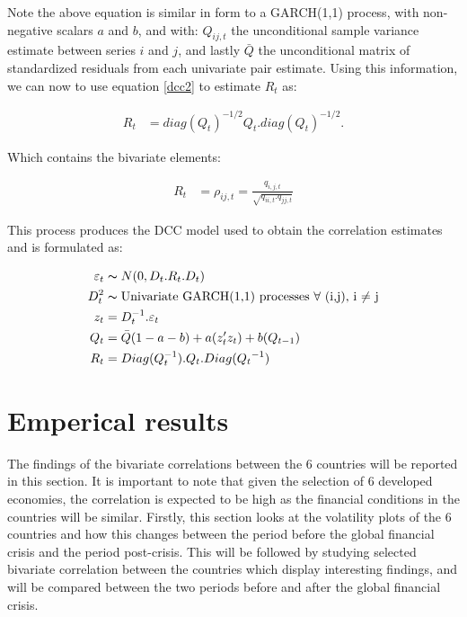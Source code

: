 \documentclass[11pt,preprint, authoryear]{elsarticle}
\numberwithin{equation}{section}
\numberwithin{figure}{section}
\numberwithin{table}{section}
\begin{document}
Note the above equation is similar in form to a GARCH(1,1) process, with
non-negative scalars \(a\) and \(b\), and with: \(Q_{ij, t}\) the
unconditional sample variance estimate between series \(i\) and \(j\),
and lastly \(\bar{Q}\) the unconditional matrix of standardized
residuals from each univariate pair estimate. Using this information, we
can now to use equation \ref{dcc2} to estimate \(R_t\) as:

\begin{align}\label{eq:dcc3}
R_t &= diag(Q_t)^{-1/2}Q_t.diag(Q_t)^{-1/2}. 
\end{align}

Which contains the bivariate elements:

\begin{align}
R_t &= \rho_{ij,t} = \frac{q_{i,j,t}}{\sqrt{q_{ii,t}.q_{jj,t}}} 
\end{align}

This process produces the DCC model used to obtain the correlation
estimates and is formulated as:

\begin{align}
\varepsilon_t &\thicksim  N(0,D_t.R_t.D_t) \notag \\
D_t^2 &\thicksim \text{Univariate GARCH(1,1) processes $\forall$ (i,j), i $\ne$ j} \notag \\
z_t&=D_t^{-1}.\varepsilon_t \notag \\
Q_t &= \bar{Q}(1-a-b)+a(z_t'z_t)+b(Q_{t-1}) \notag \\
                        R_t &= Diag(Q_t^{-1}).Q_t.Diag({Q_t}^{-1}) \notag \\
                        \end{align}

\section{Emperical results}\label{emperical-results}

The findings of the bivariate correlations between the 6 countries will
be reported in this section. It is important to note that given the
selection of 6 developed economies, the correlation is expected to be
high as the financial conditions in the countries will be similar.
Firstly, this section looks at the volatility plots of the 6 countries
and how this changes between the period before the global financial
crisis and the period post-crisis. This will be followed by studying
selected bivariate correlation between the countries which display
interesting findings, and will be compared between the two periods
before and after the global financial crisis.
\end{document}
